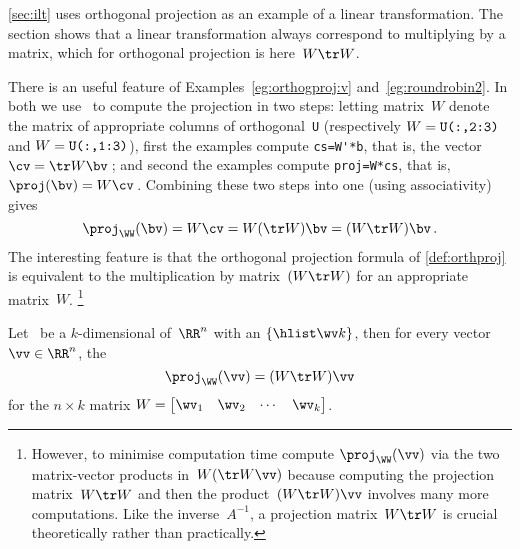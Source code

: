\begin{aside}
\autoref{sec:ilt} uses orthogonal projection as an example of a linear transformation. 
The section shows that a linear transformation always correspond to multiplying by a matrix, which for orthogonal projection is here~\(W\tr W\).
\end{aside}
There is an useful feature of Examples~\ref{eg:orthogproj:v} and~\ref{eg:roundrobin2}.
In both we use \script\ to compute the projection in two steps: 
letting matrix~\(W\) denote the matrix of appropriate columns of orthogonal~\verb|U| (respectively \(W=\verb|U(:,2:3)|\) and \(W=\verb|U(:,1:3)|\)), first the examples compute \verb|cs=W'*b|, that is, the vector \(\cv=\tr W\bv\)\,; and second the examples compute \verb|proj=W*cs|, that is, \(\proj(\bv)=W\cv\)\,.
Combining these two steps into one (using associativity) gives
\begin{equation*}
\proj_\WW(\bv)=W\cv=W(\tr W)\bv=(W\tr W)\bv\,.
\end{equation*}
The interesting feature is that the orthogonal projection formula of \autoref{def:orthproj} is equivalent to the multiplication by matrix~\((W\tr W)\) for an appropriate matrix~\(W\).
\footnote{However, to minimise computation time compute \(\proj_\WW(\vv)\) via the two matrix-vector products in~\(W(\tr W\vv)\) because computing the projection matrix~\(W\tr W\) and then the product~\((W\tr W)\vv\) involves many more computations.  Like the inverse~\(A^{-1}\), a projection matrix~\(W\tr W\) is crucial theoretically  rather than practically.}



\begin{theorem} \label{thm:projmat}
Let \WW\ be a \(k\)-dimensional  of~\(\RR^n\) with an  \(\{\hlist\wv k\}\), then for every vector \(\vv\in\RR^n\), the 
\begin{equation}
\proj_\WW(\vv)=(W\tr W)\vv
\end{equation}
for the \(n\times k\) matrix \(W=\begin{bmatrix} \wv_1&\wv_2&\cdots&\wv_k \end{bmatrix}\).
\end{theorem}

